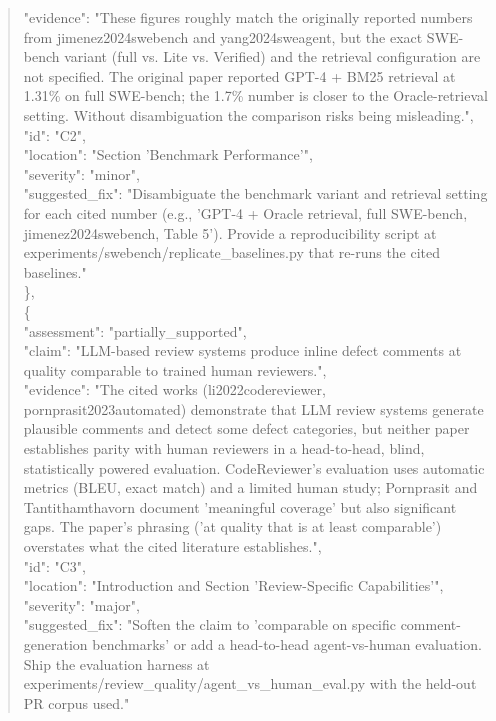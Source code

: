 \documentclass[11pt]{article}
\begin{document}
\begin{quote}
      "evidence": "These figures roughly match the originally reported numbers from jimenez2024swebench and yang2024sweagent, but the exact SWE-bench variant (full vs. Lite vs. Verified) and the retrieval configuration are not specified. The original paper reported GPT-4 + BM25 retrieval at 1.31\% on full SWE-bench; the 1.7\% number is closer to the Oracle-retrieval setting. Without disambiguation the comparison risks being misleading.",\\
      "id": "C2",\\
      "location": "Section 'Benchmark Performance'",\\
      "severity": "minor",\\
      "suggested\_fix": "Disambiguate the benchmark variant and retrieval setting for each cited number (e.g., 'GPT-4 + Oracle retrieval, full SWE-bench, jimenez2024swebench, Table 5'). Provide a reproducibility script at experiments/swebench/replicate\_baselines.py that re-runs the cited baselines."\\
    \},\\
    \{\\
      "assessment": "partially\_supported",\\
      "claim": "LLM-based review systems produce inline defect comments at quality comparable to trained human reviewers.",\\
      "evidence": "The cited works (li2022codereviewer, pornprasit2023automated) demonstrate that LLM review systems generate plausible comments and detect some defect categories, but neither paper establishes parity with human reviewers in a head-to-head, blind, statistically powered evaluation. CodeReviewer's evaluation uses automatic metrics (BLEU, exact match) and a limited human study; Pornprasit and Tantithamthavorn document 'meaningful coverage' but also significant gaps. The paper's phrasing ('at quality that is at least comparable') overstates what the cited literature establishes.",\\
      "id": "C3",\\
      "location": "Introduction and Section 'Review-Specific Capabilities'",\\
      "severity": "major",\\
      "suggested\_fix": "Soften the claim to 'comparable on specific comment-generation benchmarks' or add a head-to-head agent-vs-human evaluation. Ship the evaluation harness at experiments/review\_quality/agent\_vs\_human\_eval.py with the held-out PR corpus used."\\

\end{quote}
\end{document}
